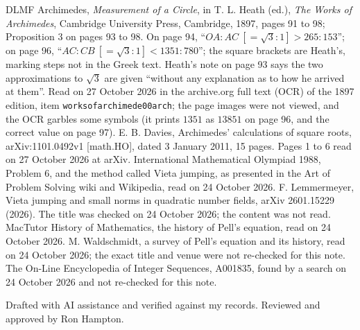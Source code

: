 \documentclass[11pt]{article}
\begin{document}
{\begin{thebibliography}{DLMF}
 Archimedes, \emph{Measurement of a Circle}, in T. L. Heath (ed.), \emph{The Works of Archimedes}, Cambridge University Press, Cambridge, 1897, pages 91 to 98; Proposition 3 on pages 93 to 98. On page 94, ``$OA:AC\ [=\sqrt3:1]>265:153$''; on page 96, ``$AC:CB\ [=\sqrt3:1]<1351:780$''; the square brackets are Heath's, marking steps not in the Greek text. Heath's note on page 93 says the two approximations to $\sqrt3$ are given ``without any explanation as to how he arrived at them''. Read on 27 October 2026 in the archive.org full text (OCR) of the 1897 edition, item \texttt{worksofarchimede00arch}; the page images were not viewed, and the OCR garbles some symbols (it prints $1351$ as $13851$ on page 96, and the correct value on page 97).
 E. B. Davies, Archimedes' calculations of square roots, arXiv:1101.0492v1 [math.HO], dated 3 January 2011, 15 pages. Pages 1 to 6 read on 27 October 2026 at arXiv.
 International Mathematical Olympiad 1988, Problem 6, and the method called Vieta jumping, as presented in the Art of Problem Solving wiki and Wikipedia, read on 24 October 2026.
 F. Lemmermeyer, Vieta jumping and small norms in quadratic number fields, arXiv 2601.15229 (2026). The title was checked on 24 October 2026; the content was not read.
 MacTutor History of Mathematics, the history of Pell's equation, read on 24 October 2026.
 M. Waldschmidt, a survey of Pell's equation and its history, read on 24 October 2026; the exact title and venue were not re-checked for this note.
 The On-Line Encyclopedia of Integer Sequences, A001835, found by a search on 24 October 2026 and not re-checked for this note.
\end{thebibliography}
\par}

\bigskip
\noindent Drafted with AI assistance and verified against my records. Reviewed and approved by Ron Hampton.
\end{document}
